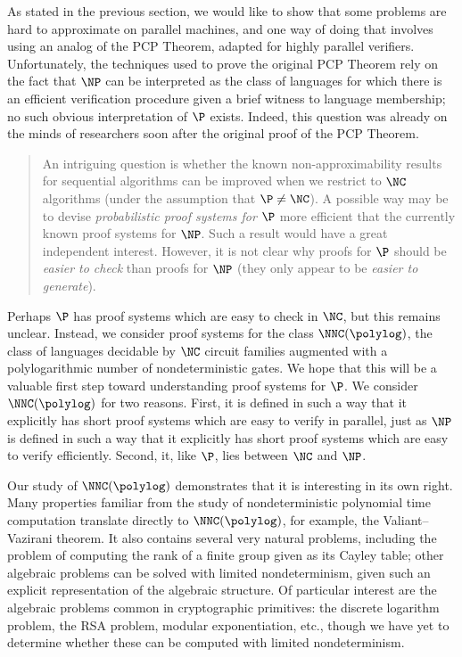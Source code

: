 \documentclass{article}
\begin{document}
%



As stated in the previous section, we would like to show that some problems are hard to approximate on parallel machines, and one way of doing that involves using an analog of the PCP Theorem, adapted for highly parallel verifiers.
Unfortunately, the techniques used to prove the original PCP Theorem rely on the fact that $\NP$ can be interpreted as the class of languages for which there is an efficient verification procedure given a brief witness to language membership; no such obvious interpretation of $\P$ exists.
Indeed, this question was already on the minds of researchers soon after the original proof of the PCP Theorem.
\blockquote[{\autocite{trevisan98}}]{
  An intriguing question is whether the known non-approximability results for sequential algorithms can be improved when we restrict to $\NC$ algorithms (under the assumption that $\P \neq \NC$).
  A possible way may be to devise \emph{probabilistic proof systems for $\P$} more efficient that the currently known proof systems for $\NP$.
  Such a result would have a great independent interest.
  However, it is not clear why proofs for $\P$ should be \emph{easier to check} than proofs for $\NP$ (they only appear to be \emph{easier to generate}).
}
Perhaps $\P$ has proof systems which are easy to check in $\NC$, but this remains unclear.
Instead, we consider proof systems for the class $\NNC(\polylog)$, the class of languages decidable by $\NC$ circuit families augmented with a polylogarithmic number of nondeterministic gates.
We hope that this will be a valuable first step toward understanding proof systems for $\P$.
We consider $\NNC(\polylog)$ for two reasons.
First, it is defined in such a way that it explicitly has short proof systems which are easy to verify in parallel, just as $\NP$ is defined in such a way that it explicitly has short proof systems which are easy to verify efficiently.
Second, it, like $\P$, lies between $\NC$ and $\NP$.

Our study of $\NNC(\polylog)$ demonstrates that it is interesting in its own right.
Many properties familiar from the study of nondeterministic polynomial time computation translate directly to $\NNC(\polylog)$, for example, the Valiant--Vazirani theorem. %
It also contains several very natural problems, including the problem of computing the rank of a finite group given as its Cayley table; other algebraic problems can be solved with limited nondeterminism, given such an explicit representation of the algebraic structure.
Of particular interest are the algebraic problems common in cryptographic primitives: the discrete logarithm problem, the RSA problem, modular exponentiation, etc., though we have yet to determine whether these can be computed with limited nondeterminism. %
\end{document}
